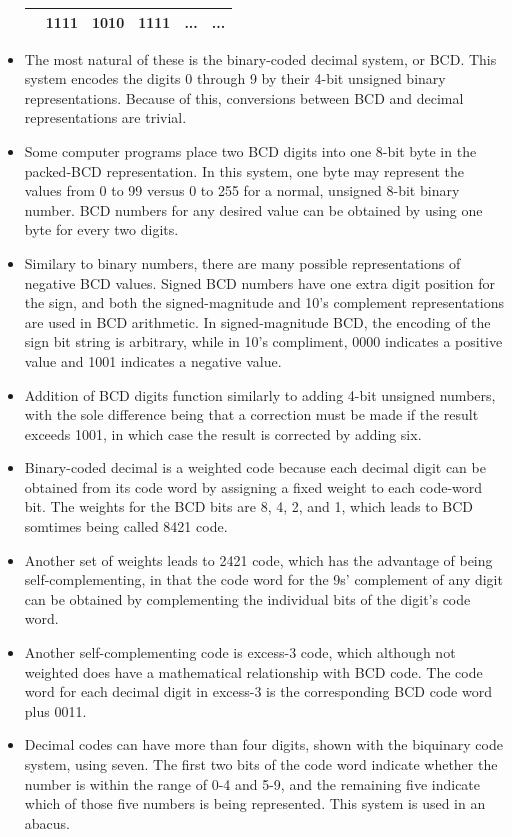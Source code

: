 \documentclass[10pt,a4paper]{article}
\begin{document}
\begin{itemize}
\begin{tabular}{|cccccc|}
 & 1111 & 1010 & 1111 & ... & ... \\ 
\hline 
\end{tabular}
\item The most natural of these is the binary-coded decimal system, or BCD. This system encodes the digits 0 through 9 by their 4-bit unsigned binary representations. Because of this, conversions between BCD and decimal representations are trivial.
\item Some computer programs place two BCD digits into one 8-bit byte in the packed-BCD representation. In this system, one byte may represent the values from 0 to 99 versus 0 to 255 for a normal, unsigned 8-bit binary number. BCD numbers for any desired value can be obtained by using one byte for every two digits.
\item Similary to binary numbers, there are many possible representations of negative BCD values. Signed BCD numbers have one extra digit position for the sign, and both the signed-magnitude and 10's complement representations are used in BCD arithmetic. In signed-magnitude BCD, the encoding of the sign bit string is arbitrary, while in 10's compliment, 0000 indicates a positive value and 1001 indicates a negative value. 
\item Addition of BCD digits function similarly to adding 4-bit unsigned numbers, with the sole difference being that a correction must be made if the result exceeds 1001, in which case the result is corrected by adding six.
\item Binary-coded decimal is a weighted code because each decimal digit can be obtained from its code word by assigning a fixed weight to each code-word bit. The weights for the BCD bits are 8, 4, 2, and 1, which leads to BCD somtimes being called 8421 code. 
\item Another set of weights leads to 2421 code, which has the advantage of being self-complementing, in that the code word for the 9s' complement of any digit can be obtained by complementing the individual bits of the digit's code word. 
\item Another self-complementing code is excess-3 code, which although not weighted does have a mathematical relationship with BCD code. The code word for each decimal digit in excess-3 is the corresponding BCD code word plus 0011. 
\item Decimal codes can have more than four digits, shown with the biquinary code system, using seven. The first two bits of the code word indicate whether the number is within the range of 0-4 and 5-9, and the remaining five indicate which of those five numbers is being represented. This system is used in an abacus. 

\end{itemize}
\end{document}
